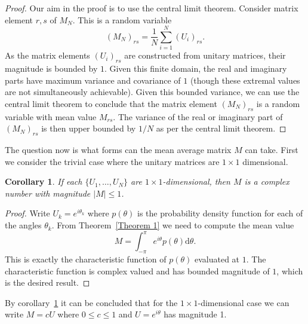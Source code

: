 \documentclass[aps,pra,twocolumn,superscriptaddress,numerical,floatfix]{revtex4-1}
\newtheorem{corollary}{Corollary}
\begin{document}
\begin{proof}\label{Proof 1}
Our aim in the proof is to use the central limit theorem.  Consider matrix element $r,s$ of $M_N$.  This is a random variable
\begin{equation}
	\left(M_N\right)_{rs} = \frac{1}{N} \sum_{i=1}^N \left(U_i\right)_{rs}.
\end{equation}
As the matrix elements $(U_i)_{rs}$ are constructed from unitary matrices, their magnitude is bounded by $1$.  Given this finite domain, the real and imaginary parts have maximum variance and covariance of $1$ (though these extremal values are not simultaneously achievable).  Given this bounded variance, we can use the central limit theorem to conclude that the matrix element $\left(M_N\right)_{rs}$ is a random variable with mean value $M_{rs}$.
The variance of the real or imaginary part of $(M_N)_{rs}$ is then upper bounded by $1/N$ as per the central limit theorem.
\end{proof}

The question now is what forms can the mean average matrix $M$ can take.   First we consider the trivial case where the unitary matrices are $1 \times 1$ dimensional.

\begin{corollary}
\label{Corollary 1}
	If each $\{U_1,\ldots,U_N\}$ are $1 \times 1$-dimensional, then $M$ is a complex number with magnitude $|M| \leq 1$.
\end{corollary}
\begin{proof}
	Write $U_k = e^{i \theta_k}$ where $p(\theta)$ is the probability density function for each of the angles $\theta_k$. From Theorem~\ref{Theorem 1} we need to compute the mean value 
	\begin{equation}
		M = \int^\pi_{-\pi} e^{i\theta} p(\theta) \mathrm{d}\theta. \label{eq:single parameter, single mode}
	\end{equation}
This is exactly the characteristic function of $p(\theta)$ evaluated at $1$.  The characteristic function is complex valued and has bounded magnitude of $1$, which is the desired result.
\end{proof}

By corollary~\ref{Corollary 1} it can be concluded that for the $1\times1$-dimensional case we can write $M=cU$ where $0 \leq c \leq 1$ and $U=e^{i\theta}$ has magnitude 1.  

\end{document}
